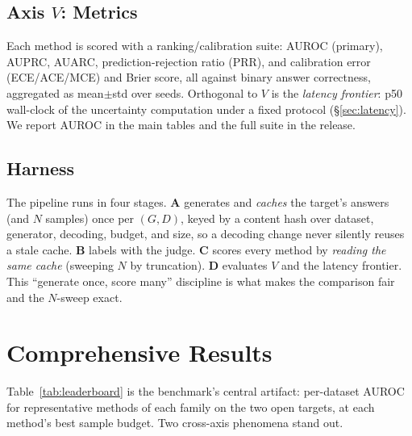 \documentclass[11pt]{article}
\begin{document}
\subsection{Axis $V$: Metrics}
Each method is scored with a ranking/calibration suite: AUROC (primary), AUPRC, AUARC,
prediction-rejection ratio (PRR), and calibration error (ECE/ACE/MCE) and Brier score,
all against binary answer correctness, aggregated as mean$\pm$std over seeds. Orthogonal
to $V$ is the \emph{latency frontier}: p50 wall-clock of the uncertainty computation
under a fixed protocol (\S\ref{sec:latency}). We report AUROC in the main tables and the
full suite in the release.

\subsection{Harness}
The pipeline runs in four stages. \textbf{A} generates and \emph{caches} the target's
answers (and $N$ samples) once per $(G,D)$, keyed by a content hash over dataset,
generator, decoding, budget, and size, so a decoding change never silently reuses a stale
cache. \textbf{B} labels with the judge. \textbf{C} scores every method by \emph{reading
the same cache} (sweeping $N$ by truncation). \textbf{D} evaluates $V$ and the latency
frontier. This ``generate once, score many'' discipline is what makes the comparison
fair and the $N$-sweep exact.

\section{Comprehensive Results}\label{sec:results}
Table~\ref{tab:leaderboard} is the benchmark's central artifact: per-dataset AUROC for
representative methods of each family on the two open targets, at each method's best
sample budget. Two cross-axis phenomena stand out.
\end{document}
